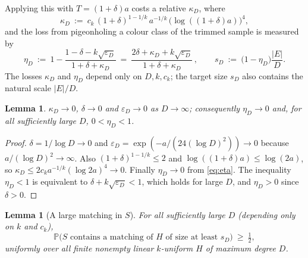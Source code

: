 \documentclass[10pt,a4paper]{amsart}
\newtheorem{lemma}[theorem]{Lemma}
\newcommand{\EE}{E}
\newcommand{\PP}{\mathbb{P}}
\begin{document}
Applying this with $T=(1+\delta)a$ costs a relative $\kappa_D$, where
\begin{equation}
\label{eq:kappa}
  \kappa_D\ :=\ c_k\,(1+\delta)^{1-1/k}\,a^{-1/k}\,\bigl(\log((1+\delta)a)\bigr)^4 ,
\end{equation}
and the loss from pigeonholing a colour class of the trimmed sample is measured by
\begin{equation}
\label{eq:eta}
  \eta_D\ :=\ 1-\frac{1-\delta-k\sqrt{\varepsilon_D}}{1+\delta+\kappa_D}
  \ =\ \frac{2\delta+\kappa_D+k\sqrt{\varepsilon_D}}{1+\delta+\kappa_D}\,,
  \qquad
  s_D\ :=\ \bigl(1-\eta_D\bigr)\frac{|\EE|}{D} .
\end{equation}
The losses $\kappa_D$ and $\eta_D$ depend only on $D,k,c_k$; the target size $s_D$
also contains the natural scale $|\EE|/D$.

\begin{lemma}
\label{lem:kappa-small}
$\kappa_D\to0$, $\delta\to0$ and $\varepsilon_D\to0$ as $D\to\infty$; consequently
$\eta_D\to0$ and, for all sufficiently large $D$, $0<\eta_D<1$.
\end{lemma}

\begin{proof}
$\delta=1/\log D\to0$ and
$\varepsilon_D=\exp(-a/(24(\log D)^2))\to0$ because
$a/(\log D)^2\to\infty$. Also $(1+\delta)^{1-1/k}\le2$ and
$\log((1+\delta)a)\le\log(2a)$, so
$\kappa_D\le 2c_k a^{-1/k}(\log 2a)^4\to0$. Finally $\eta_D\to0$ from
\eqref{eq:eta}. The inequality $\eta_D<1$ is equivalent to
$\delta+k\sqrt{\varepsilon_D}<1$, which holds for large $D$, and $\eta_D>0$ since
$\delta>0$.
\end{proof}

\begin{lemma}[A large matching in $S$]
\label{lem:largematching}
For all sufficiently large $D$ (depending only on $k$ and $c_k$),
\[
  \PP\bigl(S\text{ contains a matching of }H\text{ of size at least } s_D\bigr)
  \ \ge\ \tfrac12 ,
\]
uniformly over all finite nonempty linear $k$-uniform $H$ of maximum degree $D$.
\end{lemma}
\end{document}
